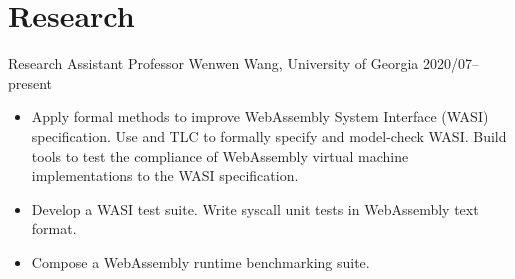 \section{Research}

\begin{experiencelist}
    \experienceitem
        {Research Assistant}
        {Professor Wenwen Wang, University of Georgia}
        {2020/07--present}
    \begin{itemize}[noitemsep, topsep=0pt]
        \item
            Apply formal methods to improve WebAssembly System Interface (WASI)
            specification. Use \tlaplus and TLC to formally specify and
            model-check WASI. Build tools to test the compliance of WebAssembly
            virtual machine implementations to the WASI specification.
        \item
            Develop a WASI test suite. Write syscall unit tests in WebAssembly
            text format.
        \item Compose a WebAssembly runtime benchmarking suite.
    \end{itemize}
\end{experiencelist}
